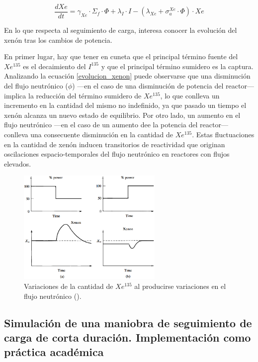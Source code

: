 \begin{equation} \label{evolucion_xenon}
  \frac{d X e}{d t}=\gamma_{X e} \cdot \Sigma_f \cdot \Phi+\lambda_I \cdot I-\left(\lambda_{X e}+\sigma_a^{X e} \cdot \Phi\right) \cdot X e
\end{equation}

En lo que respecta al seguimiento de carga, interesa conocer la evolución del xenón tras los cambios de potencia. 

En primer lugar, hay que tener en cuneta que el principal término fuente del $Xe^{135}$ es el decaimiento del $I^{135}$ y que el principal término sumidero es la captura. Analizando la ecuación \ref{evolucion_xenon} puede observarse que una disminución del flujo neutrónico ($\phi$) ---en el caso de una disminución de potencia del reactor--- implica la reducción del término sumidero de  $Xe^{135}$, lo que conlleva un incremento en la cantidad del mismo no indefinido, ya que pasado un tiempo el xenón alcanza un nuevo estado de equilibrio. Por otro lado, un aumento en el flujo neutrónico ---en el caso de un aumento dee la potencia del reactor--- conlleva una consecuente disminución en la cantidad de $Xe^{135}$. Estas fluctuaciones en la cantidad de xenón inducen transitorios de reactividad que
originan oscilaciones espacio-temporales del flujo neutrónico en reactores con flujos elevados.

\begin{figure}[h]
  \centering
  \includegraphics[width=0.62\textwidth]{content/figures/variaciones_potencia_xenon.png}
  \caption{Variaciones de la cantidad de $Xe^{135}$ al producirse variaciones en el flujo neutrónico (\cite{intro_nuclear_engineering}).}
  \label{fig:variaciones_potencia_xenon}
\end{figure}

\subsection{Simulación de una maniobra de seguimiento de carga de corta duración. Implementación como práctica académica}

